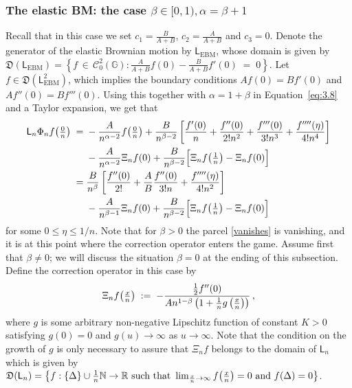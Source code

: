 \documentclass[12pt,a4paper]{article}
\theoremstyle{plain}
\theoremstyle{remark}
\newcommand{\msf}[1]{{\mathsf #1}}
\newcommand{\mc}[1]{{\mathcal #1}}
\newcommand{\mf}[1]{{\mathfrak #1}}
\newcommand{\bb}[1]{{\mathbb #1}}
\newcommand{\pfrac}[2]{\genfrac{}{}{}{1}{#1}{#2}}
\newcommand{\pn}[1]{\big(\pfrac{#1}{n}\big)}
\begin{document}
	\subsubsection{The elastic BM: the case  \texorpdfstring{$\beta \in [0,1), \alpha = \beta + 1$}{beta in [0,1), alpha=beta + 1}}
	Recall that in this case we set
	$c_1 = \frac{B}{A + B}$, $ c_2 = \frac{A}{A + B}$ and $c_3 = 0$.
	Denote the generator of the elastic Brownian motion by $\msf{L}_\text{EBM}$, whose  domain is given by
	$
	\mf{D}\left(\msf{L}_\text{EBM}\right)=\left\{f\,\in\,\mc{C}_0^2(\bb{G}):\frac{A}{A+B}f(0)-\frac{B}{A+B}f'(0)\;=\;0\right\}$.
	Let $f \in \mf{D}(\msf{L}^2_\text{EBM})$, which  implies the boundary conditions $Af(0) = Bf'(0)$ and $Af''(0) = Bf'''(0)$.
	Using this together with $\alpha = 1+\beta$ in Equation~\eqref{eq:3.8} and  a Taylor expansion, we get that
	\begin{align}
		\msf{L}_n\Phi_nf\pn{0}\;=\;& -\frac{A}{n^{\alpha - 2}}f\pn{0}+\frac{B}{n^{\beta - 2}}\left[\frac{f'(0)}{n}+\frac{f''(0)}{2!n^2}+ \frac{f'''(0)}{3!n^{3}} + \frac{f''''(\eta)}{4!n^{4}}\right]\notag\\
		&-\frac{A}{n^{\alpha - 2}}\Xi_nf(0)+\frac{B}{n^{\beta - 2}}\Big[\Xi_nf\pn{1} - \Xi_nf(0)\Big]\notag\\
		\;=\;&   \frac{B}{n^{\beta}}\left[\frac{f''(0)}{2!}+ \frac{A}{B}\frac{f''(0)}{ 3!n} + \frac{f''''(\eta)}{4!n^{2}}\right] \label{vanishes} \\
		& -\frac{A}{n^{\beta- 1}}\Xi_nf(0)+\frac{B}{n^{\beta - 2}}\Big[\Xi_nf\pn{1} - \Xi_nf(0)\Big]\label{sobra}
	\end{align}
	for some $0\leq \eta\leq 1/n$. Note that for $\beta>0$ the parcel \eqref{vanishes} is vanishing, and it is at this point where the correction operator enters the game.
	Assume first that $\beta \neq 0$; we will discuss the situation $\beta=0$ at the ending of this subsection.
	Define the correction operator in this case by
	\begin{equation}\label{eq:corr}
		\Xi_nf\pn{x} \; :=\; -\frac{\frac{1}{2}f''(0)}{An^{1 - \beta}\left(1 + \frac{1}{n}g\left(\frac{x}{n}\right)\right)}\,,
	\end{equation}
	where $g$ is some arbitrary  non-negative Lipschitz function of constant $K > 0$ satisfying $g(0) = 0 $ and $g(u) \to \infty$ as $u \to \infty$. Note that the  condition on the growth of $g$ is only necessary to assure that $\Xi_n f$ belongs to the domain of $\msf{L}_n$ which is given by
	$ \mf D(\msf{L}_n)  = \big\{f: \{\Delta\}\cup \pfrac{1}{n}\bb N \to \bb R  \text{ such that  }  \lim_{\frac{x}{n}\to \infty} f\pn{x} = 0 \text{ and } f(\Delta)=0\big\}$. 
	
\end{document}
